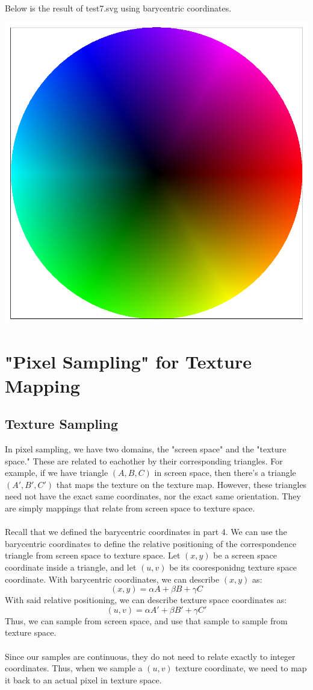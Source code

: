 \documentclass{article}
\begin{document}
Below is the result of test7.svg using barycentric coordinates.
\begin{center}
    \includegraphics[]{task 4/circle.png}
\end{center}
\section{"Pixel Sampling" for Texture Mapping}
\subsection{Texture Sampling}
In pixel sampling, we have two domains, the "screen space" and the "texture space." These are related to eachother by their corresponding triangles. For example, if we have triangle $(A, B, C)$ in screen space, then there's a triangle $(A', B', C')$ that maps the texture on the texture map. However, these triangles need not have the exact same coordinates, nor the exact same orientation. They are simply mappings that relate from screen space to texture space. 
\\
\\
Recall that we defined the barycentric coordinates in part 4. We can use the barycentric coordinates to define the relative positioning of the correspondence triangle from screen space to texture space. Let $(x, y)$ be a screen space coordinate inside a triangle, and let $(u, v)$ be its cooresponidng texture space coordinate. With barycentric coordinates, we can describe $(x, y)$ as:
$$(x, y) = \alpha A + \beta B + \gamma C$$
With said relative positioning, we can describe texture space coordinates as:
$$(u, v) = \alpha A' + \beta B' + \gamma C'$$
Thus, we can sample from screen space, and use that sample to sample from texture space. 
\\
\\
Since our samples are continuous, they do not need to relate exactly to integer coordinates. Thus, when we sample a $(u, v)$ texture coordinate, we need to map it back to an actual pixel in texture space.
\end{document}
